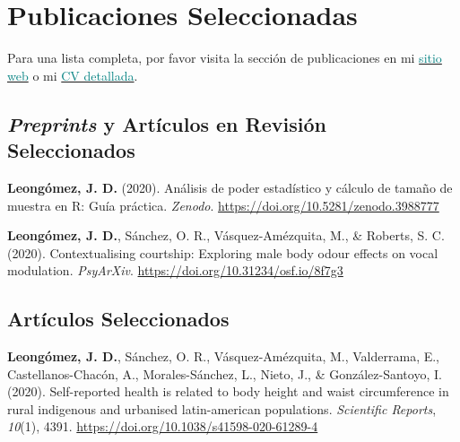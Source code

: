 \documentclass[11pt, a4paper]{awesome-cv}
\begin{document}
\hypertarget{publicaciones-seleccionadas}{%
\section{Publicaciones
Seleccionadas}\label{publicaciones-seleccionadas}}

Para una lista completa, por favor visita la sección de publicaciones en
mi
\href{https://jdleongomez.info/es/publication/}{\textcolor{teal}{sitio web}}
o mi
\href{https://jdleongomez.info/es/files/jdl_cv_es.pdf}{\textcolor{teal}{CV detallada}}.

\hypertarget{preprints-y-artuxedculos-en-revisiuxf3n-seleccionados}{%
\subsection{\texorpdfstring{\emph{Preprints} y Artículos en Revisión
Seleccionados}{Preprints y Artículos en Revisión Seleccionados}}\label{preprints-y-artuxedculos-en-revisiuxf3n-seleccionados}}

\begingroup
\setlength{\parindent}{-0.5in}
\setlength{\leftskip}{0.5in}

\hypertarget{refs_featured_preprint}{}
\leavevmode\hypertarget{ref-Leongomez2020a}{}%
\textbf{Leongómez, J. D.} (2020). {Análisis de poder estadístico y
cálculo de tamaño de muestra en R: Guía práctica}. \emph{Zenodo}.
\url{https://doi.org/10.5281/zenodo.3988777}

\leavevmode\hypertarget{ref-Leongomez2020}{}%
\textbf{Leongómez, J. D.}, Sánchez, O. R., Vásquez-Amézquita, M., \&
Roberts, S. C. (2020). Contextualising courtship: Exploring male body
odour effects on vocal modulation. \emph{PsyArXiv}.
\url{https://doi.org/10.31234/osf.io/8f7g3}

\endgroup

\hypertarget{artuxedculos-seleccionados}{%
\subsection{Artículos Seleccionados}\label{artuxedculos-seleccionados}}

\begingroup
\setlength{\parindent}{-0.5in}
\setlength{\leftskip}{0.5in}

\hypertarget{refs_featured}{}
\leavevmode\hypertarget{ref-Leonguxf3mez2020}{}%
\textbf{Leongómez, J. D.}, Sánchez, O. R., Vásquez-Amézquita, M.,
Valderrama, E., Castellanos-Chacón, A., Morales-Sánchez, L., Nieto, J.,
\& González-Santoyo, I. (2020). Self-reported health is related to body
height and waist circumference in rural indigenous and urbanised
latin-american populations. \emph{Scientific Reports}, \emph{10}(1),
4391. \url{https://doi.org/10.1038/s41598-020-61289-4}
\end{document}
